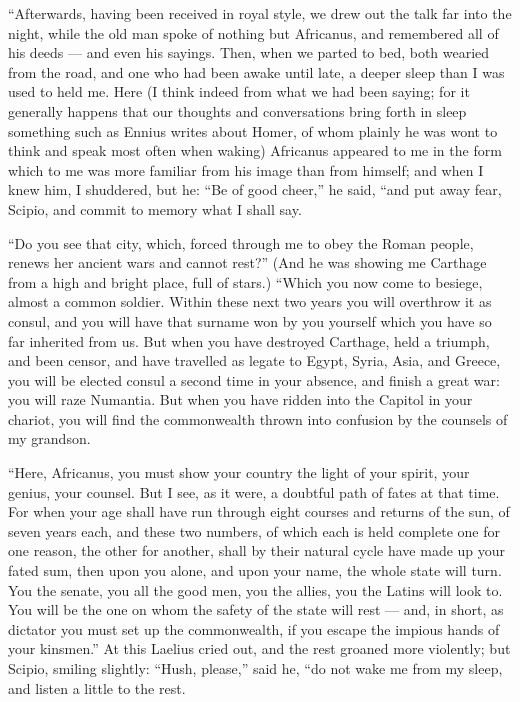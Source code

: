  ``Afterwards, having been received in royal style, we drew out the talk far into the night, while the old man spoke of nothing but Africanus, and remembered all of his deeds --- and even his sayings. Then, when we parted to bed, both wearied from the road, and one who had been awake until late, a deeper sleep than I was used to held me. Here (I think indeed from what we had been saying; for it generally happens that our thoughts and conversations bring forth in sleep something such as Ennius writes about Homer, of whom plainly he was wont to think and speak most often when waking) Africanus appeared to me in the form which to me was more familiar from his image than from himself; and when I knew him, I shuddered, but he: ``Be of good cheer,'' he said, ``and put away fear, Scipio, and commit to memory what I shall say.

 ``Do you see that city, which, forced through me to obey the Roman people, renews her ancient wars and cannot rest?'' (And he was showing me Carthage from a high and bright place, full of stars.) ``Which you now come to besiege, almost a common soldier. Within these next two years you will overthrow it as consul, and you will have that surname won by you yourself which you have so far inherited from us. But when you have destroyed Carthage, held a triumph, and been censor, and have travelled as legate to Egypt, Syria, Asia, and Greece, you will be elected consul a second time in your absence, and finish a great war: you will raze Numantia. But when you have ridden into the Capitol in your chariot, you will find the commonwealth thrown into confusion by the counsels of my grandson.

 ``Here, Africanus, you must show your country the light of your spirit, your genius, your counsel. But I see, as it were, a doubtful path of fates at that time. For when your age shall have run through eight courses and returns of the sun, of seven years each, and these two numbers, of which each is held complete one for one reason, the other for another, shall by their natural cycle have made up your fated sum, then upon you alone, and upon your name, the whole state will turn. You the senate, you all the good men, you the allies, you the Latins will look to. You will be the one on whom the safety of the state will rest --- and, in short, as dictator you must set up the commonwealth, if you escape the impious hands of your kinsmen.'' At this Laelius cried out, and the rest groaned more violently; but Scipio, smiling slightly: ``Hush, please,'' said he, ``do not wake me from my sleep, and listen a little to the rest.

